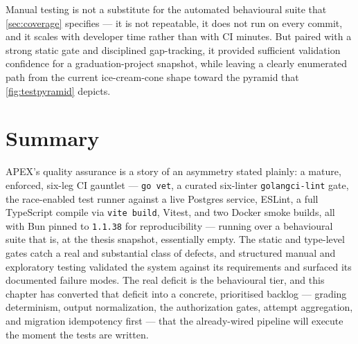 Manual testing is not a substitute for the automated behavioural suite
that \cref{sec:coverage} specifies --- it is not repeatable, it does not
run on every commit, and it scales with developer time rather than with
CI minutes. But paired with a strong static gate and disciplined gap-tracking,
it provided sufficient validation confidence for a graduation-project
snapshot, while leaving a clearly enumerated path from the current
ice-cream-cone shape toward the pyramid that \cref{fig:testpyramid}
depicts.

\section{Summary}

APEX's quality assurance is a story of an asymmetry stated plainly: a
mature, enforced, six-leg CI gauntlet --- \texttt{go vet}, a curated
six-linter \texttt{golangci-lint} gate, the race-enabled test runner
against a live Postgres service, ESLint, a full TypeScript compile via
\texttt{vite build}, Vitest, and two Docker smoke builds, all with Bun
pinned to \texttt{1.1.38} for reproducibility --- running over a
behavioural suite that is, at the thesis snapshot, essentially empty. The
static and type-level gates catch a real and substantial class of
defects, and structured manual and exploratory testing validated the
system against its requirements and surfaced its documented failure
modes. The real deficit is the behavioural tier, and this chapter has
converted that deficit into a concrete, prioritised backlog --- grading
determinism, output normalization, the authorization gates, attempt
aggregation, and migration idempotency first --- that the already-wired
pipeline will execute the moment the tests are written.
